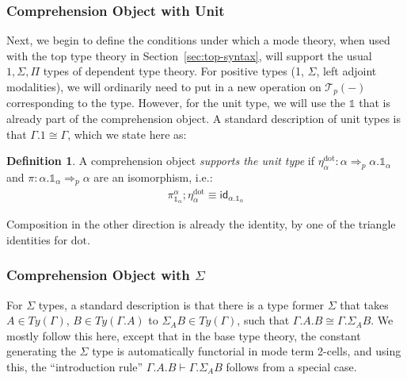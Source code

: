 \documentclass[10pt]{article}
\theoremstyle{definition}
\newtheorem{definition}{Definition}
\newcommand{\tcell}{\Rightarrow}
\newcommand{\id}{\mathsf{id}}
\newcommand\El[2]{\mathcal{T}_{#1}(#2)}
\newcommand{\sdot}{\ensuremath{\mathrm{dot}}}
\newcommand\One{\ensuremath{\mathds{1}}}
\begin{document}
\subsubsection{Comprehension Object with Unit}

Next, we begin to define the conditions under which a mode theory, when
used with the top type theory in Section~\ref{sec:top-syntax}, will
support the usual $1, \Sigma, \Pi$ types of dependent type theory.  For
positive types (1, $\Sigma$, left adjoint modalities), we will
ordinarily need to put in a new operation on $\El{p}{-}$ corresponding
to the type.  However, for the unit type, we will use the $\One$ that is
already part of the comprehension object.  A standard description of
unit types is that $\Gamma.1 \cong \Gamma$, which we state here as:
\begin{definition}\label{def:supports-unit}
A comprehension object \emph{supports the unit type} if
$\eta^\sdot_\alpha : \alpha \tcell_p \alpha.\One_\alpha$ and $\pi :
\alpha.\One_\alpha \tcell_p \alpha$ are an isomorphism, i.e.:
\begin{align}
\pi^\alpha_{\One_\alpha} ; \eta^\sdot_\alpha \equiv \id_{\alpha.\One_\alpha}
\end{align}
\end{definition}
Composition in the other direction is already the identity, by one of the triangle identities for $\sdot$.

\subsubsection{Comprehension Object with $\Sigma$}
\label{sec:compobj-sigma}

For $\Sigma$ types, a standard description is that there is a type
former $\Sigma$ that takes $A \in Ty(\Gamma)$, $B \in Ty(\Gamma.A)$ to
$\Sigma_A B \in Ty(\Gamma)$, such that $\Gamma.A.B \cong \Gamma.\Sigma_A
B$.  We mostly follow this here, except that in the base type theory,
the constant generating the $\Sigma$ type is automatically functorial in
mode term 2-cells, and using this, the ``introduction rule''
$\Gamma.A.B \vdash \Gamma.\Sigma_A B$ follows from a special case.
\end{document}
